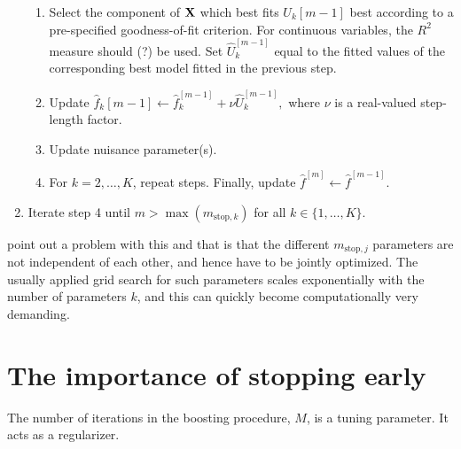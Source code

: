 \begin{algorithm}
\begin{enumerate}
\begin{enumerate}
        \item Select the component of $\mathbf{X}$ which best fits $U_k{[m-1]}$ best according to a pre-specified goodness-of-fit criterion. For continuous variables, the $R^2$ measure should (?) be used. Set $\hat{U}_k^{[m-1]}$ equal to the fitted values of the corresponding best model fitted in the previous step.
        \item Update $\hat{f}_k{[m-1]}\gets\hat{f}_k^{[m-1]}+\nu\hat{U}_k^{[m-1]},$ where $\nu$ is a real-valued step-length factor.
        \item Update nuisance parameter(s).
        \item For $k=2,\ldots,K$, repeat steps. Finally, update $\hat{f}^{[m]}\gets\hat{f}^{[m-1]}$.
    \end{enumerate}
    \item Iterate step 4 until $m>\max(m_{\text{stop},k})$ for all $k\in\{1,\ldots,K\}$.
\end{enumerate}
\end{algorithm}
\citet{thomas2018} point out a problem with this and that is that the different $m_{\text{stop},j}$ parameters are not independent of each other, and hence have to be jointly optimized. The usually applied grid search for such parameters scales exponentially with the number of parameters $k$, and this can quickly become computationally very demanding.


\section{The importance of stopping early}
The number of iterations in the boosting procedure, $M$, is a tuning parameter. It acts as a regularizer.


